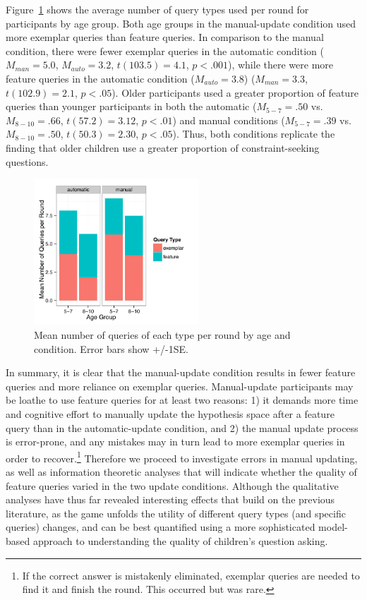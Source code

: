 \documentclass[man,floatsintext]{apa6}
\begin{document}
Figure~\ref{fig:clicks-per-agecond} 
shows the average number of query types used per round for 
participants by age group. Both age groups in the manual-update condition used 
more exemplar queries than feature queries. In comparison to the manual condition, 
there were fewer exemplar queries in the automatic condition ($M_{man} = 5.0$, 
$M_{auto} = 3.2$, $t(103.5)=4.1$, $p<.001$), while there were more feature queries 
in the automatic condition ($M_{auto} = 3.8$) ($M_{man} = 3.3$, $t(102.9)=2.1$, 
$p<.05$). Older participants used a greater proportion of feature queries than younger participants in both the automatic ($M_{5-7}=.50$ vs. $M_{8-10}=.66$, $t(57.2)=3.12$, $p<.01$) and manual conditions ($M_{5-7}=.39$ vs. $M_{8-10}=.50$, $t(50.3)=2.30$, $p<.05$). Thus, both conditions replicate the  finding that older children use a greater proportion of constraint-seeking questions. 

\begin{figure}[h]
  \centering
  \includegraphics[width=0.55\textwidth]{figures/clicks_by_ageGroup_condition_query_type}
  \caption{Mean number of queries of each type per round by age and condition. 
Error bars show +/-1SE.}
  \label{fig:clicks-per-agecond}
\end{figure} 

In summary, it is clear that the manual-update condition results in fewer feature 
queries and more reliance on exemplar queries. 
Manual-update participants may be loathe to use feature queries for at least two reasons: 1) it demands more time and cognitive effort to manually update the hypothesis space after a feature query than 
in the automatic-update condition, and 2) the manual update process is error-prone, 
and any mistakes may in turn lead to more exemplar queries in order to recover.\footnote{If the correct answer is mistakenly eliminated, exemplar queries are needed to find it and finish the round. This occurred but was rare.} Therefore we proceed to investigate errors in manual updating, as well as information theoretic analyses that will indicate whether the quality of feature queries varied in the two update conditions. Although the qualitative analyses have thus far revealed interesting effects that build on the previous literature, as the game unfolds the utility of different query types (and specific queries) changes, and can be best quantified using a more sophisticated model-based approach to
understanding the quality of children's question asking.
\end{document}
